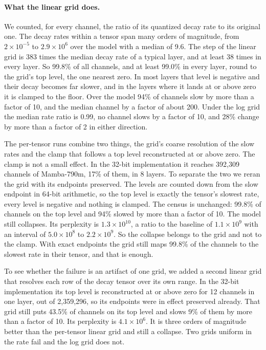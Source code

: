 \documentclass[journal]{IEEEtran}
\begin{document}
\paragraph{What the linear grid does.} We counted, for every channel, the ratio of its quantized
decay rate to its original one. The decay rates within a tensor span many orders of magnitude,
from $2\times10^{-5}$ to $2.9\times10^{6}$ over the model with a median of 9.6. The step of the
linear grid is 383 times the median decay rate of a typical layer, and at least 38 times in every
layer. So 99.8\% of all channels, and at least 99.0\% in every layer, round to the grid's top
level, the one nearest zero. In most layers that level is negative and their decay becomes far slower, and in the layers where it lands at or above zero it is clamped to the floor. Over the model 94\% of channels slow by more than a factor of 10, and the median channel by
a factor of about 200. Under the log grid the median rate ratio is 0.99, no channel slows by a
factor of 10, and 28\% change by more than a factor of 2 in either direction.

The per-tensor runs combine two things, the grid's coarse resolution of the slow rates and
the clamp that follows a top level reconstructed at or above zero. The clamp is not a small
effect. In the 32-bit implementation it reaches 392{,}309 channels of Mamba-790m, 17\% of them,
in 8 layers. To separate the two we reran the grid with its endpoints preserved. The levels are
counted down from the slow endpoint in 64-bit arithmetic, so the top level is exactly the
tensor's slowest rate, every level is negative and nothing is clamped. The census is unchanged:
99.8\% of channels on the top level and 94\% slowed by more than a factor of 10. The model still
collapses. Its perplexity is $1.3\times10^{10}$, a ratio to the baseline of
$1.1\times10^{9}$ with an interval of $5.0\times10^{8}$ to
$2.2\times10^{9}$. So the collapse belongs to the grid and not to the clamp. With exact
endpoints the grid still maps 99.8\% of the channels to the slowest rate in their tensor, and
that is enough.

To see whether the failure is an artifact of one
grid, we added a second linear grid that
resolves each row of the decay tensor over its own range. In the 32-bit implementation its
top level is reconstructed at or above zero for 12 channels in one layer, out of 2{,}359{,}296, so
its endpoints were in effect preserved already. That grid still puts 43.5\% of channels
on its top level and slows 9\% of them by more than a factor of 10. Its perplexity is
$4.1\times10^{6}$. It is
three orders of magnitude better than the per-tensor linear grid and
still a collapse. Two grids uniform in the rate
fail and the log grid does not.
\end{document}
